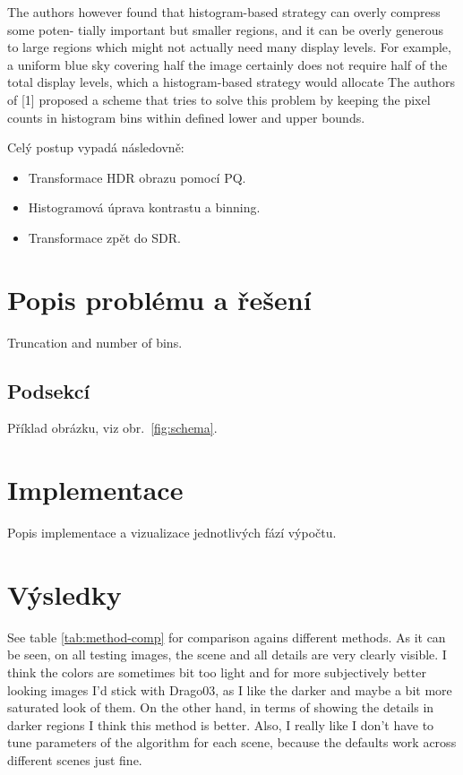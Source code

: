 \documentclass[11pt,a4paper,oneside]{article}
\begin{document}
The authors however found that
histogram-based strategy can overly compress some poten-
tially important but smaller regions, and it can be overly
generous to large regions which might not actually need many
display levels. For example, a uniform blue sky covering half
the image certainly does not require half of the total display
levels, which a histogram-based strategy would allocate
The authors of [1] proposed a scheme that tries to solve this
problem by keeping the pixel counts in histogram bins within
defined lower and upper bounds.

Celý postup vypadá následovně:
\begin{itemize}
    \item Transformace HDR obrazu pomocí PQ.
    \item Histogramová úprava kontrastu a binning. %
    \item Transformace zpět do SDR.
\end{itemize}

\section{Popis problému a řešení}


Truncation and number of bins.

\subsection{Podsekcí}
Příklad obrázku, viz obr.~\ref{fig:schema}.



\section{Implementace}
Popis implementace a vizualizace jednotlivých fází výpočtu.
\section{Výsledky}


See table \ref{tab:method-comp} for comparison agains different methods.
As it can be seen, on all testing images, the scene and all details are very
clearly visible. I think the colors are sometimes bit too light and for more
subjectively better looking images I'd stick with Drago03, as I like the darker and maybe a bit more saturated look of them.
On the other hand, in terms of showing the details in darker regions I think this method is
better.
Also, I really like I don't have to tune parameters of the algorithm for each
scene, because the defaults work across different scenes just fine.
\end{document}
